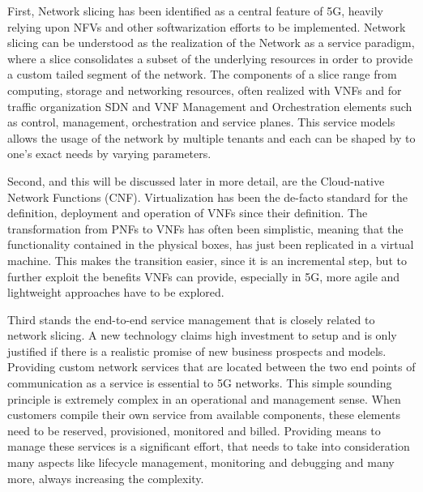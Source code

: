 First, Network slicing has been identified as a central feature of 5G, heavily relying upon NFVs and other softwarization efforts to be implemented. Network slicing can be understood as the realization of the Network as a service paradigm, where a slice consolidates a subset of the underlying resources in order to provide a custom tailed segment of the network. The components of a slice range from computing, storage and networking resources, often realized with VNFs and for traffic organization SDN and VNF Management and Orchestration elements such as control, management, orchestration and service planes. This service models allows the usage of the network by multiple tenants and each can be shaped by to one's exact needs by varying parameters.
 
Second, and this will be discussed later in more detail, are the Cloud-native Network Functions (CNF).  Virtualization has been the de-facto standard for the definition, deployment and operation of VNFs since their definition. The transformation from PNFs to VNFs has often been simplistic, meaning that the functionality contained in the physical boxes, has just been replicated in a virtual machine. This makes the transition easier, since it is an incremental step, but to further exploit the benefits VNFs can provide, especially in 5G, more agile and lightweight approaches have to be explored. 

Third stands the end-to-end service management that is closely related to network slicing. A new technology claims high investment to setup and is only justified if there is a realistic promise of new business prospects and models. Providing custom network services that are located between the two end points of communication as a service is essential to 5G networks. This simple sounding principle is extremely complex in an operational and management sense. When customers compile their own service from available components, these elements need to be reserved, provisioned, monitored and billed. Providing means to manage these services is a significant effort, that needs to take into consideration many aspects like lifecycle management, monitoring and debugging and many more, always increasing the complexity. 

